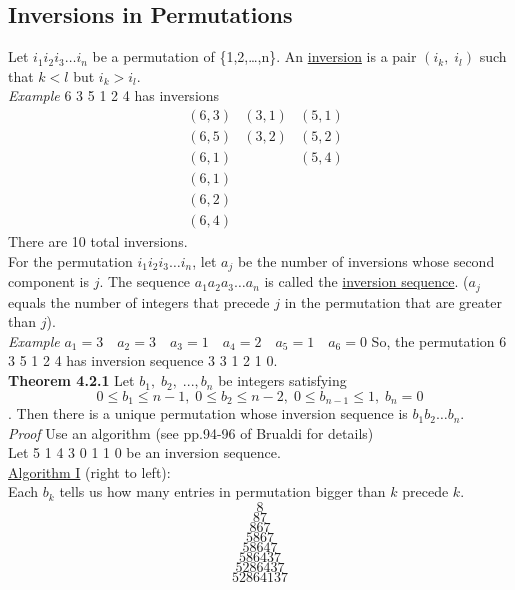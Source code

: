 \documentclass[12pt]{article}
\begin{document}
\newpage
\subsection{Inversions in Permutations}
Let $i_1i_2i_3\ldots i_n$ be a permutation of \{1,2,\ldots,n\}. An \underline{inversion} is a pair $(i_k,\;i_l)$ such that $k<l$ but $i_k>i_l$.\\

{\sl Example } 6 3 5 1 2 4 has inversions
\begin{align*}
    &(6,3) & (3,1) & (5,1)\\
    &(6,5) & (3,2) & (5,2)\\
    &(6,1) &     & (5,4)\\
    &(6,1) &     &\\
    &(6,2) &     &\\
    &(6,4) &     &
\end{align*}
There are 10 total inversions. \\

For the permutation $i_1i_2i_3\ldots i_n$, let $a_j$ be the number of inversions whose second component is $j$. The sequence $a_1a_2a_3\ldots a_n$ is called the \underline{inversion sequence}. ($a_j$ equals the number of integers that precede $j$ in the permutation that are greater than $j$).\\

{\sl Example} $a_1=3\quad a_2=3\quad a_3=1\quad a_4=2\quad a_5=1\quad a_6=0$
So, the permutation 6 3 5 1 2 4 has inversion sequence 3 3 1 2 1 0.\\

{\bf Theorem 4.2.1} Let $b_1,\;b_2,\;...,b_n$ be integers satisfying $$0\le b_1\le n-1,\;0\le b_2\le n-2,\;0\le b_{n-1}\le 1,\; b_n=0$$. Then there is a unique permutation whose inversion sequence is $b_1b_2\ldots b_n$.\\

{\sl Proof} Use an algorithm (see pp.94-96 of Brualdi for details)\\
Let 5 1 4 3 0 1 1 0 be an inversion sequence.\\

\underline{Algorithm I} (right to left):\\ 
Each $b_k$ tells us how many entries in permutation bigger than $k$ precede $k$.
$$8$$
$$87$$
$$867$$
$$5867$$
$$58647$$
$$586437$$
$$5286437$$
$$52864137$$\\
\end{document}
